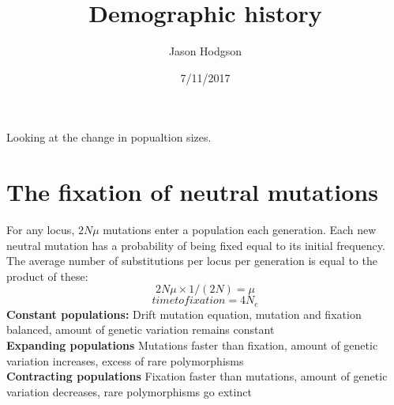 \documentclass[11pt]{article}
\title{Demographic history}
\author{Jason Hodgson}
\date{7/11/2017}
\begin{document}
\maketitle
Looking at the change in popualtion sizes.\\
\section{The fixation of neutral mutations}
For any locus, $2N\mu$ mutations enter a population each generation. Each new neutral mutation has a probability of being fixed equal to its initial frequency. The average number of substitutions per locus per generation is equal to the product of these:
\\
\begin{equation}
2N\mu\times1/(2N) = \mu 
\end{equation}
\begin{equation}
time to fixation = 4N_{e}
\end{equation}
{\bf Constant populations: }Drift mutation equation, mutation and fixation balanced, amount of genetic variation remains constant\\
{\bf Expanding populations} Mutations faster than fixation, amount of genetic variation increases, excess of rare polymorphisms\\
{\bf Contracting populations} Fixation faster than mutations, amount of genetic variation decreases, rare polymorphisms go extinct
\\
\end{document}

